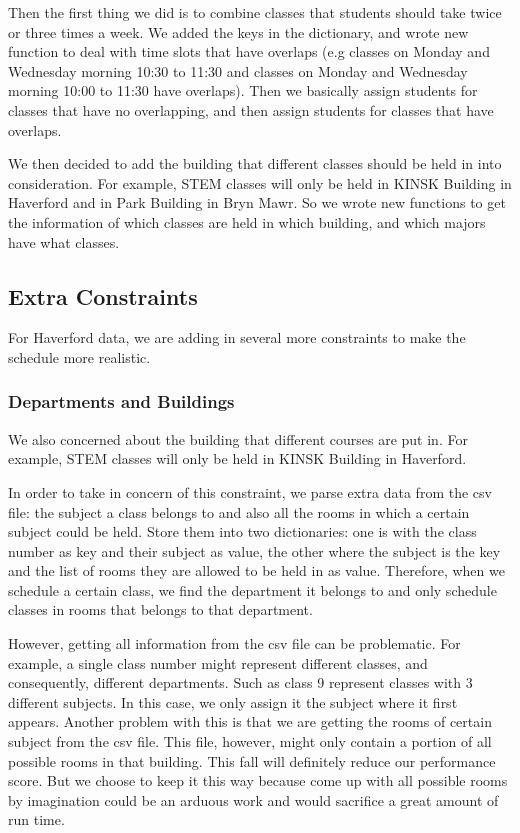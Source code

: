\documentclass[11pt, oneside]{article}   	%
\begin{document}
Then the first thing we did is to combine classes that students should take twice or three times a week. We added the keys in the dictionary, and wrote new function to deal with time slots that have overlaps (e.g classes on Monday and Wednesday morning 10:30 to 11:30 and classes on Monday and Wednesday morning 10:00 to 11:30 have overlaps). Then we basically assign students for classes that have no overlapping, and then assign students for classes that have overlaps. 

We then decided to add the building that different classes should be held in into consideration. For example, STEM classes will only be held in KINSK Building in Haverford and in Park Building in Bryn Mawr. So we wrote new functions to get the information of which classes are held in which building, and which majors have what classes.

\subsection{Extra Constraints}
For Haverford data, we are adding in several more constraints to make the schedule more realistic.
\subsubsection{Departments and Buildings}
We also concerned about the building that different courses are put in. For example, STEM classes will only be held in KINSK Building in Haverford. 

In order to take in concern of this constraint, we parse extra data from the csv file: the subject a class belongs to and also all the rooms in which a certain subject could be held. Store them into two dictionaries: one is with the class number as key and their subject as value, the other where the subject is the key and the list of rooms they are allowed to be held in as value. Therefore, when we schedule a certain class, we find the department it belongs to and only schedule classes in rooms that belongs to that department.

However, getting all information from the csv file can be problematic. For example, a single class number might represent different classes, and consequently, different departments. Such as class 9 represent classes with 3 different subjects. In this case, we only assign it the subject where it first appears. Another problem with this is that we are getting the rooms of certain subject from the csv file. This file, however, might only contain a portion of all possible rooms in that building. This fall will definitely reduce our performance score. But we choose to keep it this way because come up with all possible rooms by imagination could be an arduous work and would sacrifice a great amount of run time.
\end{document}
